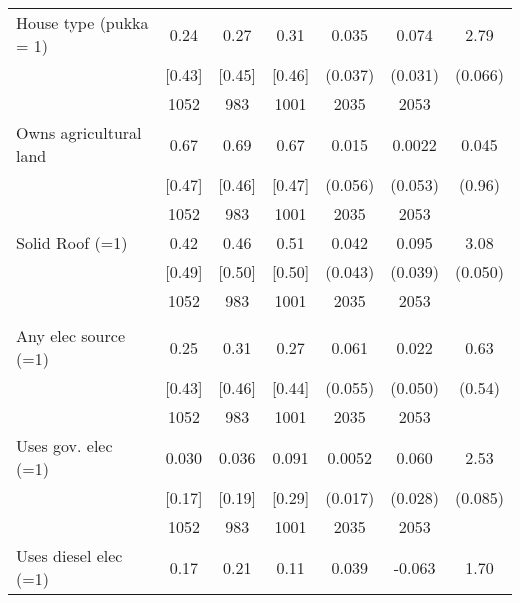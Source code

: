 \begin{table}[htbp]
\begin{tabular*}{1\hsize}{@{\hskip\tabcolsep\extracolsep\fill}l*{1}{cccccc}}
House type (pukka = 1)          &     0.24&     0.27&     0.31&    0.035         &    0.074\sym{**} &     2.79\sym{*}  \\
                                &   [0.43]&   [0.45]&   [0.46]&  (0.037)         &  (0.031)         &  (0.066)         \\
                                &     1052&      983&     1001&     2035         &     2053         &                  \\
Owns agricultural land          &     0.67&     0.69&     0.67&    0.015         &   0.0022         &    0.045         \\
                                &   [0.47]&   [0.46]&   [0.47]&  (0.056)         &  (0.053)         &   (0.96)         \\
                                &     1052&      983&     1001&     2035         &     2053         &                  \\
Solid Roof (=1)                 &     0.42&     0.46&     0.51&    0.042         &    0.095\sym{**} &     3.08\sym{*}  \\
                                &   [0.49]&   [0.50]&   [0.50]&  (0.043)         &  (0.039)         &  (0.050)         \\
                                &     1052&      983&     1001&     2035         &     2053         &                  \\
\addlinespace
\multicolumn{7}{c}{\emph{Panel C. Energy Access}} \\
Any elec source (=1)            &     0.25&     0.31&     0.27&    0.061         &    0.022         &     0.63         \\
                                &   [0.43]&   [0.46]&   [0.44]&  (0.055)         &  (0.050)         &   (0.54)         \\
                                &     1052&      983&     1001&     2035         &     2053         &                  \\
\hspace{5mm} Uses gov. elec (=1)             &    0.030&    0.036&    0.091&   0.0052         &    0.060\sym{**} &     2.53\sym{*}  \\
                                &   [0.17]&   [0.19]&   [0.29]&  (0.017)         &  (0.028)         &  (0.085)         \\
                                &     1052&      983&     1001&     2035         &     2053         &                  \\
\hspace{5mm} Uses diesel elec (=1)           &     0.17&     0.21&     0.11&    0.039         &   -0.063         &     1.70         \\

\end{tabular*}
\end{table}

